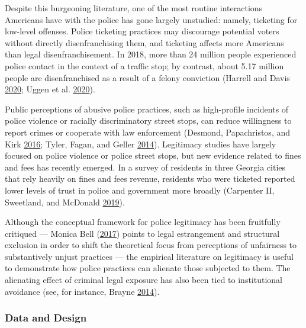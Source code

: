 \documentclass[
  12pt,
]{article}
\begin{document}
Despite this burgeoning literature, one of the most routine interactions Americans have with the police has gone largely unstudied: namely, ticketing for low-level offenses. Police ticketing practices may discourage potential voters without directly disenfranchising them, and ticketing affects more Americans than legal disenfranchisement. In 2018, more than 24 million people experienced police contact in the context of a traffic stop; by contrast, about 5.17 million people are disenfranchised as a result of a felony conviction (Harrell and Davis \protect\hyperlink{ref-Harrell2020}{2020}; Uggen et al. \protect\hyperlink{ref-Uggen2020}{2020}).

Public perceptions of abusive police practices, such as high-profile incidents of police violence or racially discriminatory street stops, can reduce willingness to report crimes or cooperate with law enforcement (Desmond, Papachristos, and Kirk \protect\hyperlink{ref-Desmond2016}{2016}; Tyler, Fagan, and Geller \protect\hyperlink{ref-Tyler2014}{2014}). Legitimacy studies have largely focused on police violence or police street stops, but new evidence related to fines and fees has recently emerged. In a survey of residents in three Georgia cities that rely heavily on fines and fees revenue, residents who were ticketed reported lower levels of trust in police and government more broadly (Carpenter II, Sweetland, and McDonald \protect\hyperlink{ref-CarpenterII2019}{2019}).

Although the conceptual framework for police legitimacy has been fruitfully critiqued --- Monica Bell (\protect\hyperlink{ref-Bell2017}{2017}) points to legal estrangement and structural exclusion in order to shift the theoretical focus from perceptions of unfairness to substantively unjust practices --- the empirical literature on legitimacy is useful to demonstrate how police practices can alienate those subjected to them. The alienating effect of criminal legal exposure has also been tied to institutional avoidance (see, for instance, Brayne \protect\hyperlink{ref-Brayne2014}{2014}).

\hypertarget{data-and-design}{%
\subsubsection*{Data and Design}\label{data-and-design}}
\end{document}
